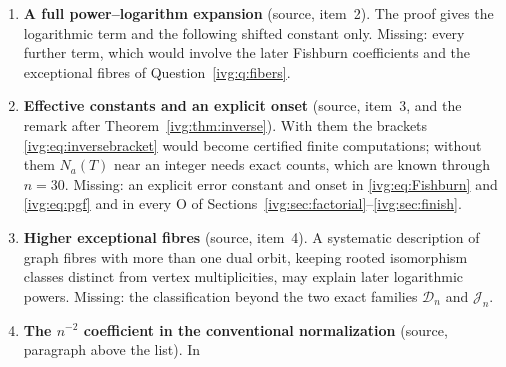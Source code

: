 \documentclass[11pt,letterpaper]{article}
\theoremstyle{definition}\newtheorem{definition}[theorem]{Definition}
\theoremstyle{remark}\newtheorem{remark}[theorem]{Remark}
\newcommand{\OO}{\mathrm O}
\begin{document}
\begin{enumerate}
{ $n=26$.)} Thirty terms
 neither confirm nor contradict $b_0$, and a crossing does not contradict
 Theorem~\ref{ivg:thm:constant}, whose remainder may change sign. One input
 can be tested much further: with $T_m$ computed exactly through $m=200$
 (inclusion--exclusion over forced zero rows and columns, which reproduces
 the $T_n$ of Section~\ref{ivg:sec:checks}),
 $T_m/F_m-2\log m=0.338$, $0.283$, $0.201$ at $m=30,50,200$, and fits of
 $b+(c_1\log m+c_0)/m+c_2(\log m)/m^2$ give $0.15904$, against
 $2a_0=2(\log q+\gamma)=0.159031$ in \eqref{ivg:eq:rootconstant}. This
 tests that input only; at $m=30$ it is still $0.18$ from its limit, so the
 remainders are large at the sizes of the table. \textup{(Added after the
 independent check of 5~October 2026: that check computed $T_m$ exactly
 through $m=200$ by a second route, the bivariate generating function of the
 diagonal in Proposition~4\,(ii) and (2.12) of~\cite{HJ}, differentiated at
 $v=1$, and found the same values; with an additional $m^{-2}$ term the fits
 on five points ending at $m=160$ and at $m=200$ give $0.159031$, that is
 $2a_0$ to about $2\cdot10^{-7}$.)}
\item\label{ivg:q:expansion} \textbf{A full power--logarithm expansion}
 (source, item~2). The proof gives the logarithmic term and the following
 shifted constant only. Missing: every further term, which would involve the
 later Fishburn coefficients and the exceptional fibres of
 Question~\ref{ivg:q:fibers}.
\item\label{ivg:q:effective} \textbf{Effective constants and an explicit
 onset} (source, item~3, and the remark after
 Theorem~\ref{ivg:thm:inverse}). With them the brackets
 \eqref{ivg:eq:inversebracket} would become certified finite computations;
 without them $N_a(T)$ near an integer needs exact counts, which are known
 through $n=30$. Missing: an explicit error constant and onset in
 \eqref{ivg:eq:Fishburn} and \eqref{ivg:eq:pgf} and in every $\OO$ of
 Sections~\ref{ivg:sec:factorial}--\ref{ivg:sec:finish}.
\item\label{ivg:q:fibers} \textbf{Higher exceptional fibres} (source,
 item~4). A systematic description of graph fibres with more than one
 dual orbit, keeping rooted isomorphism classes distinct from vertex
 multiplicities, may explain later logarithmic powers. Missing: the
 classification beyond the two exact families $\mathcal D_n$ and
 $\mathcal J_n$.
\item\label{ivg:q:conventional} \textbf{The $n^{-2}$ coefficient in the
 conventional normalization} (source, paragraph above the list). In

\end{enumerate}
\end{document}
